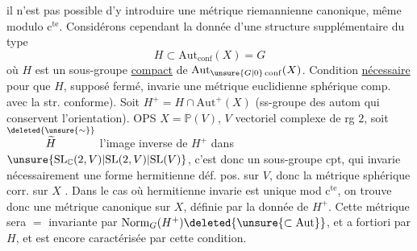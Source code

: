 
il n'est pas possible d'y introduire une métrique riemannienne canonique, même modulo $\mathrm c^{\mathrm{te}}$. Considérons cependant la donnée d'une structure supplémentaire du type
\[
H\subset\mathrm{Aut}_{\mathrm{conf}}(X)=G
\]
où $H$ est un sous-groupe \uline{compact} de $\mathrm{Aut}_{\unsure{G|0}\,\mathrm{conf}}(X)$. Condition \uline{nécessaire} pour que $H$, supposé fermé, invarie une métrique euclidienne sphérique comp. avec la str. conforme). Soit $H^+=H\cap\mathrm{Aut}^+(X)$ (ss-groupe des autom qui conservent l'orientation). OPS $X=\mathbb P(V)$, $V$ vectoriel complexe de rg $2$,  soit $\overset{\deleted{\unsure{\sim}}}{\widetilde H}$ l'image inverse de $H^+$ dans $\unsure{\mathrm{SL}_{\mathbb C}(2,V)|\mathrm{SL}(2,V)|\mathrm{SL}(V)}$, c'est donc un sous-groupe cpt, qui invarie nécessairement une forme hermitienne déf. pos. sur $V$, donc la métrique sphérique corr. sur $X$ . Dans le cas où   hermitienne invarie est unique mod $\mathrm c^{\mathrm{te}}$, on trouve donc une métrique  canonique sur $X$, définie par la  donnée de $H^+$. Cette métrique sera $=$ invariante par $\mathrm{Norm}_G(H^+)\deleted{\unsure{\subset\mathrm{Aut}}}$, et a fortiori par $H$, et est encore caractérisée par cette condition.

